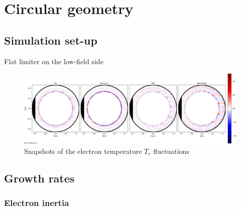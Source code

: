 \section{Circular geometry}

\subsection{Simulation set-up}

Flat limiter on the low-field side


\begin{figure}[H]\centering
	\centering
	\includegraphics[width=1\textwidth]{schemes/CIRC_fluctT.jpg}
	\caption{Snapshots of the electron temperature $T_e$ fluctuations}
	\label{fig:CIRC_fluctPHI}
\end{figure}


\subsection{Growth rates}


\subsubsection{Electron inertia}

